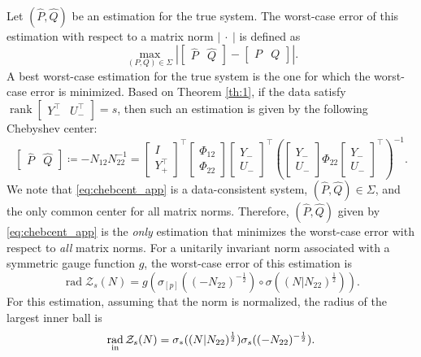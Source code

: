 \documentclass[pdflatex,sn-mathphys-num]{sn-jnl}%
\DeclareMathOperator{\rank}{rank}
\DeclareMathOperator{\rad}{rad}
\newcommand{\norm}[1]{\left|#1\right|}
\theoremstyle{thmstyleone}
\begin{document}
Let $(\hat{P},\hat{Q})$ be an estimation for the true system. The worst-case error of this estimation with respect to a matrix norm $\norm{\ \cdot\ }$ is defined as
\begin{equation}
\max_{(P,Q)\in\Sigma}\norm{\begin{bmatrix}
\hat{P} & \hat{Q}
\end{bmatrix}-\begin{bmatrix}
P & Q
\end{bmatrix}}.
\end{equation}
A best worst-case estimation for the true system is the one for which the worst-case error is minimized. Based on Theorem \ref{th:1}, if the data satisfy $\rank\begin{bmatrix}
    Y_-^\top & U_-^\top
    \end{bmatrix}=s$, then such an estimation is given by the following Chebyshev center:
\begin{equation}
\label{eq:chebcent_app}
\begin{bmatrix} \hat{P} & \hat{Q} \end{bmatrix}\coloneqq-N_{12}N_{22}^{-1}
=\begin{bmatrix}
I \\ Y_+^\top
\end{bmatrix}^\top\begin{bmatrix}
\Phi_{12} \\ \Phi_{22}
\end{bmatrix}\begin{bmatrix}
Y_- \\ U_-
\end{bmatrix}^\top \left(\begin{bmatrix}
Y_- \\ U_-
\end{bmatrix}\Phi_{22}\begin{bmatrix}
Y_- \\ U_-
\end{bmatrix}^\top\right)^{-1}.
\end{equation}
We note that \eqref{eq:chebcent_app} is a data-consistent system, $(\hat{P},\hat{Q})\in\Sigma$, and the only common center for all matrix norms. Therefore, $(\hat{P},\hat{Q})$ given by \eqref{eq:chebcent_app} is the \emph{only} estimation that minimizes the worst-case error with respect to \emph{all} matrix norms. For a unitarily invariant norm associated with a symmetric gauge function $g$, the worst-case error of this estimation is
\begin{equation}
\label{eq:Chebrad_app}
\rad\mathcal{Z}_s(N)=g(\sigma_{[p]}((-N_{22})^{-\frac{1}{2}})\circ \sigma((N|N_{22})^{\frac{1}{2}})).
\end{equation}
For this estimation, assuming that the norm is normalized, the radius of the largest inner ball is
\begin{equation}
\label{eq:inner_app}
\rad_{\textup{in}}\mathcal{Z}_s(N)=\sigma_*((N|N_{22})^{\frac{1}{2}})\sigma_s((-N_{22})^{-\frac{1}{2}}).
\end{equation}
\end{document}
